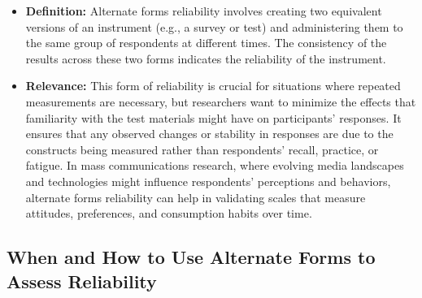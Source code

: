 \documentclass[
]{book}
\begin{document}
\begin{itemize}
\item
  \textbf{Definition:} Alternate forms reliability involves creating two equivalent versions of an instrument (e.g., a survey or test) and administering them to the same group of respondents at different times. The consistency of the results across these two forms indicates the reliability of the instrument.
\item
  \textbf{Relevance:} This form of reliability is crucial for situations where repeated measurements are necessary, but researchers want to minimize the effects that familiarity with the test materials might have on participants' responses. It ensures that any observed changes or stability in responses are due to the constructs being measured rather than respondents' recall, practice, or fatigue. In mass communications research, where evolving media landscapes and technologies might influence respondents' perceptions and behaviors, alternate forms reliability can help in validating scales that measure attitudes, preferences, and consumption habits over time.
\end{itemize}

\hypertarget{when-and-how-to-use-alternate-forms-to-assess-reliability}{%
\subsection*{When and How to Use Alternate Forms to Assess Reliability}\label{when-and-how-to-use-alternate-forms-to-assess-reliability}}
\end{document}
